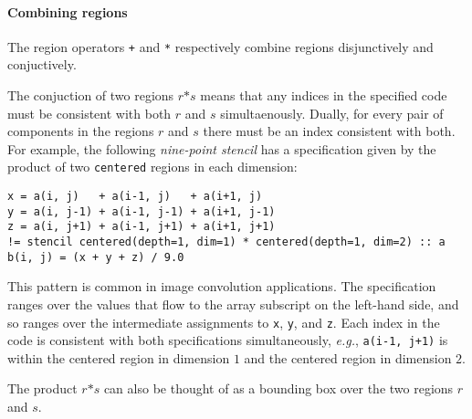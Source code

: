 \documentclass[10pt,preprint,numbers]{sigplanconf}
\theoremstyle{definition}
\newcommand{\eg}{\emph{e.g.}}
\newcommand{\term}[1]{\texttt{#1}}
\begin{document}
\paragraph{Combining regions}




%

The region operators \term{+} and \term{*} respectively combine
regions disjunctively and conjuctively.

The conjuction of two regions $r \term{*} s$ means that any indices
in the specified code must be consistent with both $r$ and $s$
simultaenously. Dually, for every pair of components in the regions
$r$ and $s$ there must be an index consistent with both.
For example, the following \emph{nine-point stencil}
has a specification given by the product of two \texttt{centered}
regions in each dimension:
\begin{verbatim}
x = a(i, j)   + a(i-1, j)   + a(i+1, j)
y = a(i, j-1) + a(i-1, j-1) + a(i+1, j-1)
z = a(i, j+1) + a(i-1, j+1) + a(i+1, j+1)
!= stencil centered(depth=1, dim=1) * centered(depth=1, dim=2) :: a
b(i, j) = (x + y + z) / 9.0
\end{verbatim}
This pattern is common in image convolution applications.
The specification ranges over the
values that flow to the array subscript on the left-hand side,
and so ranges over the intermediate assignments to \term{x},
\term{y}, and \term{z}. Each index in the code is consistent
with both specifications simultaneously, \eg{}, \texttt{a(i-1, j+1)}
is within the centered region in dimension $1$ and the centered region
in dimension $2$.

The product $r \term{*} s$ can also be thought of as a bounding box
over the two regions $r$ and $s$.
\end{document}
